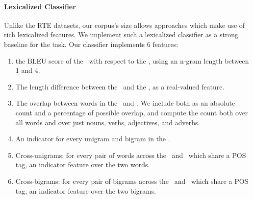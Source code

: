 \paragraph{Lexicalized Classifier}
Unlike the RTE datasets, our corpus's size allows approaches which make use of
  rich lexicalized features.
We implement such a lexicalized classifier as a strong baseline 
  for the task.
Our classifier implements 6 features:
\begin{enumerate}
\setlength\itemsep{-0.25em}
  \item the BLEU score of the \hypothesis\ with respect
  to the \premise, using an n-gram length between 1 and 4.

  \item The length difference between the \hypothesis\ and the \premise, as a real-valued
  feature.

  \item The overlap between words in the \premise\ and \hypothesis. We include
  both as an absolute count and a percentage of possible overlap, and compute
  the count both over all words and over just nouns, verbs, adjectives, 
  and adverbs.
  
  \item\label{lst:ngram} An indicator for every unigram and bigram in the \hypothesis.

  \item\label{lst:unigram} Cross-unigrams: for every pair of words across the \premise\ and \hypothesis\ which share a 
  POS tag, an indicator feature over the two words.
  
  \item\label{lst:bigram} Cross-bigrams: for every pair of bigrams across the \premise\ and \hypothesis\ which share a 
  POS tag, an indicator feature over the two bigrams.
\end{enumerate}

%
%

